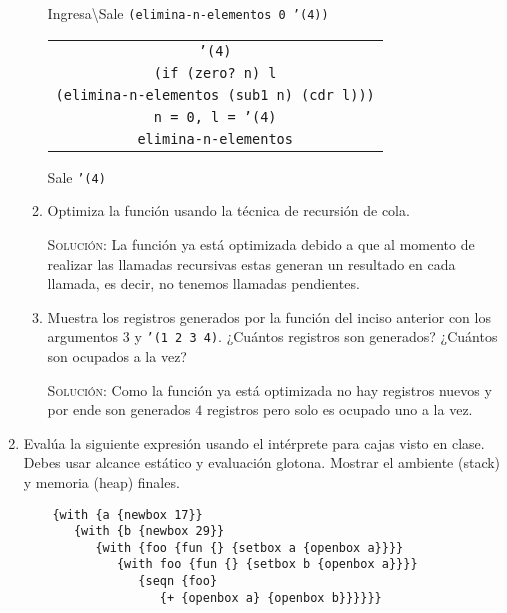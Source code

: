 \documentclass[letterpaper,11pt]{article}
\begin{document}
\begin{enumerate}
\begin{enumerate}
        Ingresa\textbackslash Sale \texttt{(elimina-n-elementos 0 '(4))}
        \begin{center}
            \begin{tabular}[h]{|c|}
                \hline
                \texttt{'(4)} \\
                \texttt{(if (zero? n) l} \\
                \texttt{(elimina-n-elementos (sub1 n) (cdr l)))} \\
                \texttt{n = 0, l = '(4)} \\
                \texttt{elimina-n-elementos} \\
                \hline
            \end{tabular}
        \end{center}
        Sale \texttt{'(4)}

        \item Optimiza la función usando la técnica de recursión de cola.
        
        \textsc{Solución:} La función ya está optimizada debido a que al 
        momento de realizar las llamadas recursivas estas generan un resultado 
        en cada llamada, es decir, no tenemos llamadas pendientes. 

        \item Muestra los registros generados por la función del inciso anterior
        con los argumentos $3$ y \texttt{'(1 2 3 4)}. ¿Cuántos registros son 
        generados? ¿Cuántos son ocupados a la vez?

        \textsc{Solución:} Como la función ya está optimizada no hay 
        registros nuevos y por ende son generados $4$ registros pero solo es 
        ocupado uno a la vez.
    \end{enumerate}

    \item Evalúa la siguiente expresión usando el intérprete para cajas visto 
    en clase. Debes usar alcance estático y evaluación glotona. Mostrar el 
    ambiente (stack) y memoria (heap) finales.
    \begin{verbatim}
    {with {a {newbox 17}}
       {with {b {newbox 29}}
          {with {foo {fun {} {setbox a {openbox a}}}}
             {with foo {fun {} {setbox b {openbox a}}}}
                {seqn {foo}
                   {+ {openbox a} {openbox b}}}}}}
    \end{verbatim}


\end{enumerate}
\end{document}
